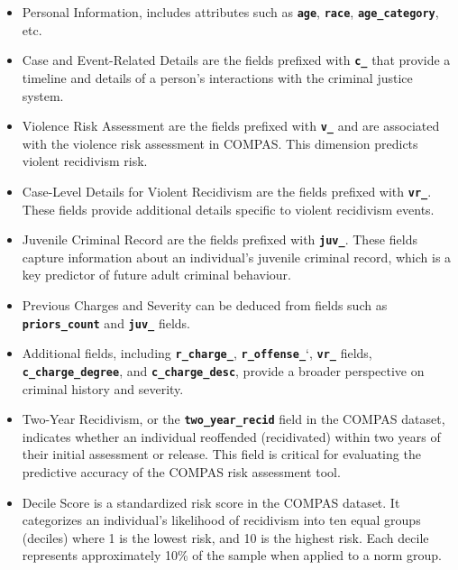 \documentclass[conference]{IEEEtran}
\begin{document}
	\begin{itemize}
	
		\item Personal Information, includes attributes such as \textbf{\texttt{age}}, \textbf{\texttt{race}}, \textbf{\texttt{age\_category}}, etc.
		
		\item Case and Event-Related Details are the fields prefixed with \textbf{\texttt{c\_}} that provide a timeline and details of a person's interactions with the criminal justice system.
	
		\item Violence Risk Assessment are the fields prefixed with \textbf{\texttt{v\_}} and are associated with the violence risk assessment in COMPAS. This dimension predicts violent recidivism risk.
	
		\item Case-Level Details for Violent Recidivism are the fields prefixed with \textbf{\texttt{vr\_}}. These fields provide additional details specific to violent recidivism events.
	
		\item Juvenile Criminal Record are the fields prefixed with \textbf{\texttt{juv\_}}. These fields capture information about an individual's juvenile criminal record, which is a key predictor of future adult criminal behaviour.
	
		\item Previous Charges and Severity can be deduced from fields such as \textbf{\texttt{priors\_count}} and \textbf{\texttt{juv\_}} fields.
	
		\item Additional fields, including \textbf{\texttt{r\_charge\_}}, \textbf{\texttt{r\_offense\_}}`, \textbf{\texttt{vr\_}} fields, \textbf{\texttt{c\_charge\_degree}}, and \textbf{\texttt{c\_charge\_desc}}, provide a broader perspective on criminal history and severity.
	
	
		\item Two-Year Recidivism, or the \textbf{\texttt{two\_year\_recid}} field in the COMPAS dataset, indicates whether an individual reoffended (recidivated) within two years of their initial assessment or release. This field is critical for evaluating the predictive accuracy of the COMPAS risk assessment tool.
	
		\item Decile Score is a standardized risk score in the COMPAS dataset. It categorizes an individual's likelihood of recidivism into ten equal groups (deciles) where 1 is the lowest risk, and 10 is the highest risk. Each decile represents approximately 10\% of the sample when applied to a norm group.

	\end{itemize}
\end{document}
